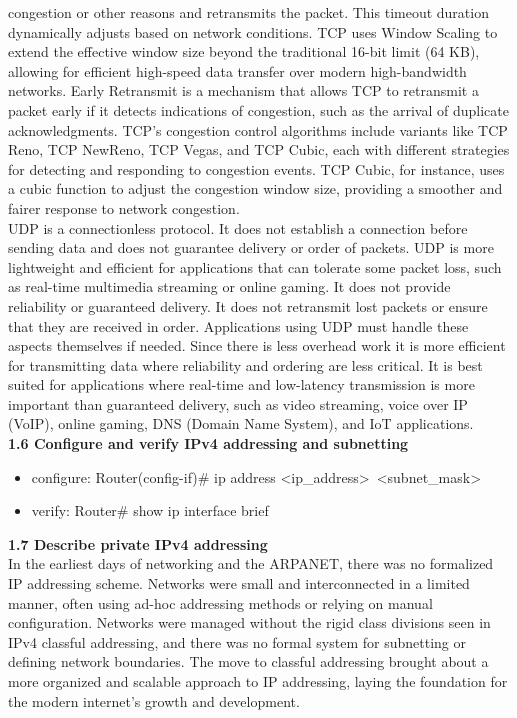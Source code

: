 \documentclass{article}
\begin{document}
congestion or other reasons and retransmits the packet. This timeout duration dynamically adjusts based on network conditions. TCP uses Window Scaling to extend the effective window size beyond the traditional 16-bit limit (64 KB), allowing for efficient high-speed data transfer over modern high-bandwidth networks. Early Retransmit is a mechanism that allows TCP to retransmit a packet early if it detects indications of congestion, such as the arrival of duplicate acknowledgments. TCP's congestion control algorithms include variants like TCP Reno, TCP NewReno, TCP Vegas, and TCP Cubic, each with different strategies for detecting and responding to congestion events. TCP Cubic, for instance, uses a cubic function to adjust the congestion window size, providing a smoother and fairer response to network congestion.\\

	UDP is a connectionless protocol. It does not establish a connection before sending data and does not guarantee delivery or order of packets. UDP is more lightweight and efficient for applications that can tolerate some packet loss, such as real-time multimedia streaming or online gaming. It does not provide reliability or guaranteed delivery. It does not retransmit lost packets or ensure that they are received in order. Applications using UDP must handle these aspects themselves if needed. Since there is less overhead work it is more efficient for transmitting data where reliability and ordering are less critical. It is best suited for applications where real-time and low-latency transmission is more important than guaranteed delivery, such as video streaming, voice over IP (VoIP), online gaming, DNS (Domain Name System), and IoT applications.\\
  	
\textbf{1.6 Configure and verify IPv4 addressing and subnetting}

\begin{itemize}
\item configure: Router(config-if)\# ip address \textless ip\_address\textgreater\ \textless subnet\_mask\textgreater
\item verify: Router\# show ip interface brief
\end{itemize}
  
\textbf{1.7 Describe private IPv4 addressing}\\

		In the earliest days of networking and the ARPANET, there was no formalized IP addressing scheme. Networks were small and interconnected in a limited manner, often using ad-hoc addressing methods or relying on manual configuration. Networks were managed without the rigid class divisions seen in IPv4 classful addressing, and there was no formal system for subnetting or defining network boundaries. The move to classful addressing brought about a more organized and scalable approach to IP addressing, laying the foundation for the modern internet's growth and development.\\
		
\end{document}

